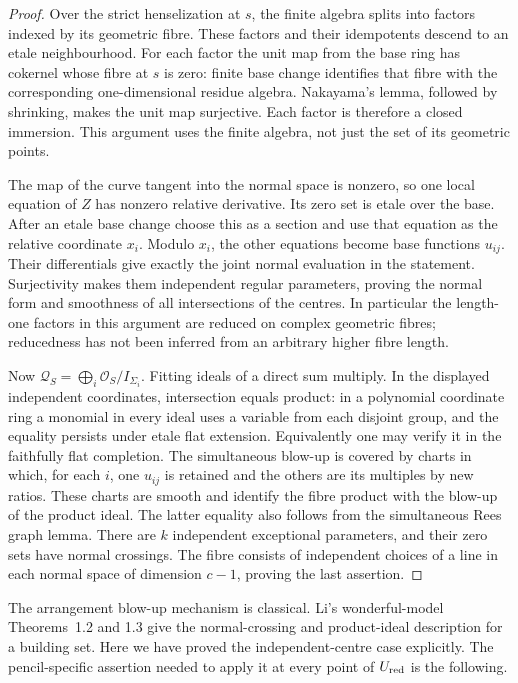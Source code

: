 \documentclass[11pt,reqno]{amsart}
\numberwithin{equation}{section}
\theoremstyle{definition}\newtheorem{definition}[theorem]{Definition}
\theoremstyle{remark}\newtheorem{remark}[theorem]{Remark}
\newcommand{\OO}{\mathcal O}\newcommand{\II}{\mathcal I}
\begin{document}
\begin{proof}
Over the strict henselization at $s$, the finite algebra splits into
factors indexed by its geometric fibre. These factors and their
idempotents descend to an etale neighbourhood. For each factor the
unit map from the base ring has cokernel whose fibre at $s$ is zero:
finite base change identifies that fibre with the corresponding
one-dimensional residue algebra. Nakayama's lemma, followed by
shrinking, makes the unit map surjective. Each factor is therefore a
closed immersion. This argument uses the finite algebra, not just the
set of its geometric points.

The map of the curve tangent into the normal space is nonzero, so one
local equation of $Z$ has nonzero relative derivative. Its zero set
is etale over the base. After an etale base change choose this as a
section and use that equation as the relative coordinate $x_i$.
Modulo $x_i$, the other equations become base functions $u_{ij}$.
Their differentials give exactly the joint normal evaluation in the
statement. Surjectivity makes them independent regular parameters,
proving the normal form and smoothness of all intersections of the
centres. In particular the length-one factors in this argument are
reduced on complex geometric fibres; reducedness has not been inferred
from an arbitrary higher fibre length.

Now $\mathcal Q_S=\bigoplus_i\OO_S/I_{\Sigma_i}$. Fitting ideals of
a direct sum multiply. In the displayed independent coordinates,
intersection equals product: in a polynomial coordinate ring a
monomial in every ideal uses a variable from each disjoint group, and
the equality persists under etale flat extension. Equivalently one
may verify it in the faithfully flat completion. The simultaneous
blow-up is covered by charts in which, for each $i$, one $u_{ij}$ is
retained and the others are its multiples by new ratios. These charts
are smooth and identify the fibre product with the blow-up of the
product ideal. The latter equality also follows from the simultaneous
Rees graph lemma. There are $k$ independent exceptional parameters,
and their zero sets have normal crossings. The fibre consists of
independent choices of a line in each normal space of dimension
$c-1$, proving the last assertion.
\end{proof}

The arrangement blow-up mechanism is classical. Li's wonderful-model
Theorems~1.2 and 1.3 \cite{Li2009v161} give the normal-crossing and
product-ideal description for a building set. Here we have proved the
independent-centre case explicitly. The pencil-specific assertion
needed to apply it at every point of $U_{\rm red}$ is the following.
\end{document}
